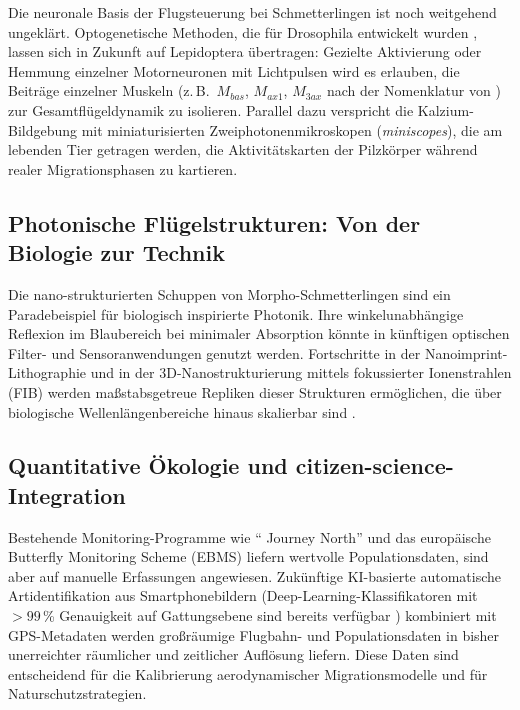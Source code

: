 ﻿\documentclass[a4paper,12pt]{article}
\theoremstyle{definition}
\begin{document}
	Die neuronale Basis der Flugsteuerung bei Schmetterlingen ist noch weitgehend
	ungeklärt.
	Optogenetische Methoden, die für Drosophila entwickelt wurden \cite{lima2005remote},
	lassen sich in Zukunft auf Lepidoptera übertragen:
	Gezielte Aktivierung oder Hemmung einzelner Motorneuronen mit Lichtpulsen
	wird es erlauben, die Beiträge einzelner Muskeln (z.\,B.\ $M_{bas}$,
	$M_{ax1}$, $M_{3ax}$ nach der Nomenklatur von \cite{wootton1981support})
	zur Gesamtflügeldynamik zu isolieren.
	Parallel dazu verspricht die Kalzium-Bildgebung mit miniaturisierten
	Zweiphotonenmikroskopen (\textit{miniscopes}), die am lebenden Tier getragen
	werden, die Aktivitätskarten der Pilzkörper während realer Migrationsphasen
	zu kartieren.
	
	\subsection{Photonische Flügelstrukturen: Von der Biologie zur Technik}
	
	Die nano-strukturierten Schuppen von Morpho-Schmetterlingen sind ein
	Paradebeispiel für biologisch inspirierte Photonik.
	Ihre winkelunabhängige Reflexion im Blaubereich bei minimaler Absorption
	könnte in künftigen optischen Filter- und Sensoranwendungen genutzt werden.
	Fortschritte in der Nanoimprint-Lithographie und in der 3D-Nanostrukturierung
	mittels fokussierter Ionenstrahlen (FIB) werden maßstabsgetreue Repliken
	dieser Strukturen ermöglichen, die über biologische Wellenlängenbereiche
	hinaus skalierbar sind \cite{vigneron2010morpho}.
	
	\subsection{Quantitative Ökologie und citizen-science-Integration}
	
	Bestehende Monitoring-Programme wie `` Journey North'' und das europäische
	Butterfly Monitoring Scheme (EBMS) liefern wertvolle Populationsdaten,
	sind aber auf manuelle Erfassungen angewiesen.
	Zukünftige KI-basierte automatische Artidentifikation aus Smartphonebildern
	(Deep-Learning-Klassifikatoren mit $> 99$\,\% Genauigkeit auf Gattungsebene
	sind bereits verfügbar \cite{tabak2019machine}) kombiniert mit GPS-Metadaten
	werden großräumige Flugbahn- und Populationsdaten in bisher unerreichter
	räumlicher und zeitlicher Auflösung liefern.
	Diese Daten sind entscheidend für die Kalibrierung aerodynamischer
	Migrationsmodelle und für Naturschutzstrategien.
	
\end{document}
